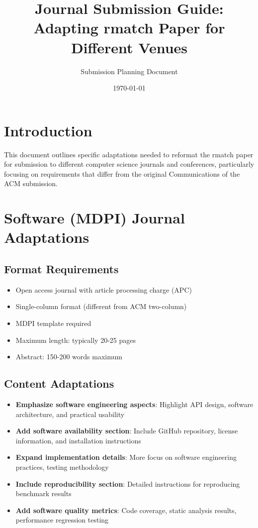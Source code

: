 \documentclass{article}
\title{Journal Submission Guide: Adapting rmatch Paper for Different Venues}
\author{Submission Planning Document}
\date{\today}
\begin{document}
\maketitle

\section{Introduction}

This document outlines specific adaptations needed to reformat the rmatch paper for submission to different computer science journals and conferences, particularly focusing on requirements that differ from the original Communications of the ACM submission.

\section{Software (MDPI) Journal Adaptations}

\subsection{Format Requirements}
\begin{itemize}
\item Open access journal with article processing charge (APC)
\item Single-column format (different from ACM two-column)
\item MDPI template required
\item Maximum length: typically 20-25 pages
\item Abstract: 150-200 words maximum
\end{itemize}

\subsection{Content Adaptations}
\begin{itemize}
\item \textbf{Emphasize software engineering aspects}: Highlight API design, software architecture, and practical usability
\item \textbf{Add software availability section}: Include GitHub repository, license information, and installation instructions
\item \textbf{Expand implementation details}: More focus on software engineering practices, testing methodology
\item \textbf{Include reproducibility section}: Detailed instructions for reproducing benchmark results
\item \textbf{Add software quality metrics}: Code coverage, static analysis results, performance regression testing
\end{itemize}
\end{document}
